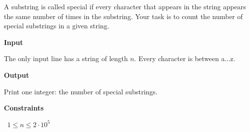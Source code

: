 A substring is called special if every character that appears in the string appears the same number of times in the substring.
Your task is to count the number of special substrings in a given string.

\vspace{0.3cm}\noindent\textbf{Input}

The only input line has a string of length $n$. Every character is between a...z.

\vspace{0.3cm}\noindent\textbf{Output}

Print one integer: the number of special substrings.

\vspace{0.3cm}\noindent\textbf{Constraints}

\textbullet\ $1 \le n \le 2 \cdot 10^5$